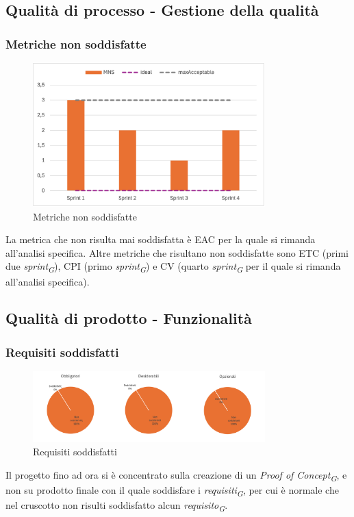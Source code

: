 \subsection{Qualità di processo - Gestione della qualità}
\subsubsection{Metriche non soddisfatte}
\begin{figure}[H]
    \centering
    \includegraphics[width=0.8\textwidth]{./images/MNS.png}
    \caption{Metriche non soddisfatte}
\end{figure}
La metrica che non risulta mai soddisfatta è EAC per la quale si rimanda all'analisi specifica. Altre metriche che risultano non soddisfatte sono ETC (primi due \textit{sprint\textsubscript{G}}), CPI (primo \textit{sprint\textsubscript{G}}) e CV (quarto \textit{sprint\textsubscript{G}} per il quale si rimanda all'analisi specifica).

\subsection{Qualità di prodotto - Funzionalità}
\subsubsection{Requisiti soddisfatti}
\begin{figure}[H]
    \centering
    \includegraphics[width=0.8\textwidth]{./images/requisitisoddisfatti.png}
    \caption{Requisiti soddisfatti}
\end{figure}
Il progetto fino ad ora si è concentrato sulla creazione di un \textit{Proof of Concept\textsubscript{G}}, e non su prodotto finale con il quale soddisfare i \textit{requisiti\textsubscript{G}}, per cui è normale che nel cruscotto non risulti soddisfatto alcun \textit{requisito\textsubscript{G}}.

